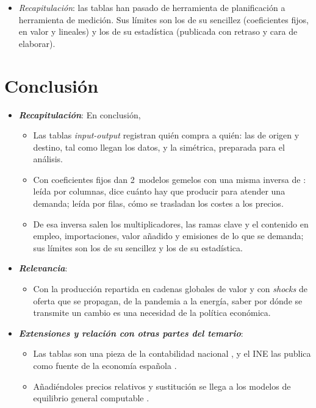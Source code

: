 \documentclass[11pt]{article}
\begin{document}
\begin{itemize}
\item \emph{Recapitulación}: las tablas han pasado de herramienta de planificación a herramienta de medición. Sus límites son los de su sencillez (coeficientes fijos, en valor y lineales) y los de su estadística (publicada con retraso y cara de elaborar).
\end{itemize}


\section*{Conclusión}

\begin{itemize}
\item \textbf{\emph{Recapitulación}}: En conclusión,
  \begin{itemize}
  \item Las tablas \emph{input-output} registran quién compra a quién: las de origen y destino, tal como llegan los datos, y la simétrica, preparada para el análisis.
  \item Con coeficientes fijos dan 2~modelos gemelos con una misma inversa de : leída por columnas, dice cuánto hay que producir para atender una demanda; leída por filas, cómo se trasladan los costes a los precios.
  \item De esa inversa salen los multiplicadores, las ramas clave y el contenido en empleo, importaciones, valor añadido y emisiones de lo que se demanda; sus límites son los de su sencillez y los de su estadística.
  \end{itemize}
\item \textbf{\emph{Relevancia}}:
  \begin{itemize}
  \item Con la producción repartida en cadenas globales de valor y con \emph{shocks} de oferta que se propagan, de la pandemia a la energía, saber por dónde se transmite un cambio es una necesidad de la política económica.
  \end{itemize}
\item \textbf{\emph{Extensiones y relación con otras partes del temario}}:
  \begin{itemize}
  \item Las tablas son una pieza de la contabilidad nacional , y el INE las publica como fuente de la economía española .
  \item Añadiéndoles precios relativos y sustitución se llega a los modelos de equilibrio general computable .

\end{itemize}
\end{itemize}
\end{document}
